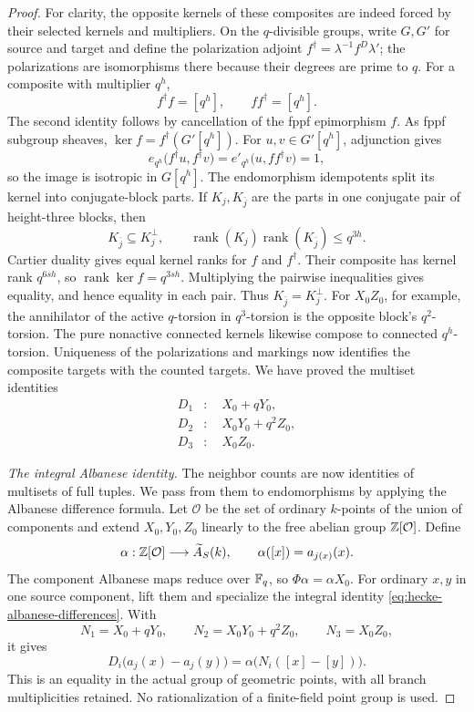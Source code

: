 \begin{proof}
For clarity, the opposite kernels of these composites are
indeed forced by their selected kernels and multipliers.  On
the \(q\)-divisible groups, write \(G,G'\) for source and target
and define the polarization adjoint
\(f^\dagger=\lambda^{-1}f^D\lambda'\); the polarizations are
isomorphisms there because their degrees are prime to \(q\).
For a composite with multiplier \(q^h\),
\[
f^\dagger f=[q^h],\qquad ff^\dagger=[q^h].
\]
The second identity follows by cancellation of the fppf
epimorphism \(f\).  As fppf subgroup sheaves,
\(\ker f=f^\dagger(G'[q^h])\).  For \(u,v\in G'[q^h]\),
adjunction gives
\[
e_{q^h}\bigl(f^\dagger u,f^\dagger v\bigr)
 =e'_{q^h}\bigl(u,ff^\dagger v\bigr)=1,
\]
so the image is isotropic in \(G[q^h]\).  The endomorphism
idempotents split its kernel into conjugate-block parts.
If \(K_j,K_{\bar j}\) are the parts in one conjugate pair of
height-three blocks, then
\[
K_{\bar j}\subseteq K_j^\perp,\qquad
\operatorname{rank}(K_j)\operatorname{rank}(K_{\bar j})
 \leq q^{3h}.
\]
Cartier duality gives equal kernel ranks for \(f\) and \(f^\dagger\).
Their composite has kernel rank \(q^{6sh}\), so
\(\operatorname{rank}\ker f=q^{3sh}\).
Multiplying the pairwise inequalities gives equality, and hence
equality in each pair.  Thus \(K_{\bar j}=K_j^\perp\).
For \(X_0Z_0\), for example, the annihilator of the active
\(q\)-torsion in \(q^3\)-torsion is the opposite block's
\(q^2\)-torsion.  The pure nonactive connected kernels likewise
compose to connected \(q^h\)-torsion.  Uniqueness of the
polarizations and markings now identifies the composite targets
with the counted targets.  We have proved the multiset identities
\begin{equation}\label{eq:ordinary-neighbor-counts}
\begin{aligned}
D_1&:\quad X_0+qY_0,\\
D_2&:\quad X_0Y_0+q^2Z_0,\\
D_3&:\quad X_0Z_0.
\end{aligned}
\end{equation}

\smallskip
\noindent\emph{The integral Albanese identity.}
The neighbor counts are now identities of multisets of full tuples.
We pass from them to endomorphisms by applying the Albanese difference
formula.  Let \(\mathcal O\) be the set of ordinary \(k\)-points of the
union of components and extend \(X_0,Y_0,Z_0\) linearly to the
free abelian group \(\mathbb{Z}[\mathcal O]\).  Define
\[
\alpha:\mathbb{Z}[\mathcal O]\longrightarrow\widetilde A_S(k),
\qquad \alpha([x])=a_{j(x)}(x).
\]
The component Albanese maps reduce over \(\mathbb{F}_q\), so
\(\Phi\alpha=\alpha X_0\).  For ordinary \(x,y\) in one source
component, lift them and specialize the integral identity
\eqref{eq:hecke-albanese-differences}.  With
\[
N_1=X_0+qY_0,\qquad
N_2=X_0Y_0+q^2Z_0,\qquad
N_3=X_0Z_0,
\]
it gives
\[
D_i\bigl(a_j(x)-a_j(y)\bigr)
 =\alpha\bigl(N_i([x]-[y])\bigr).
\]
This is an equality in the actual group of geometric points,
with all branch multiplicities retained.  No rationalization
of a finite-field point group is used.


\end{proof}
